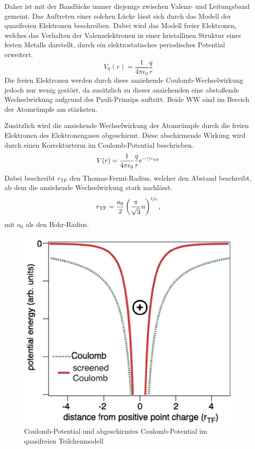 Daher ist mit der Bandlücke immer diejenige zwischen Valenz- und Leitungsband gemeint.
Das Auftreten einer solchen Lücke lässt sich durch das Modell der quasifreien Elektronen beschreiben. Dabei wird das Modell freier Elektronen, welches das Verhalten der Valenzelektronen in einer kristallinen Struktur eines festen Metalls darstellt, durch ein elektrostatisches periodisches Potential
erweitert.
\begin{equation}
    \label{eq:coulomb_potential}
    V_0(r) = \frac{1}{4\pi\epsilon_0}\frac{q}{r}
\end{equation}
Die freien Elektronen werden durch diese anziehende Coulomb-Wechselwirkung jedoch nur wenig gestört, da zusätzlich zu dieser anziehenden eine abstoßende Wechselwirkung aufgrund des Pauli-Prinzips auftritt. Beide WW sind im Bereich der Atomrümpfe am stärksten.

Zusätzlich wird die anziehende Wechselwirkung der Atomrümpfe durch die freien Elektronen des Elektronengases abgeschirmt. Diese abschirmende Wirkung wird durch einen Korrekturterm im Coulomb-Potential beschrieben.
\begin{equation}
    \label{eq:}
    V(r) = \frac{1}{4\pi\epsilon_0}\frac{q}{r}e^{-\nicefrac{r}{r_{\text{TF}}}}
\end{equation}
Dabei beschreibt $r_{\text{TF}}$ den Thomas-Fermi-Radius, welcher den Abstand beschreibt, ab dem die anziehende Wechselwirkung stark nachlässt.
\begin{equation}
    \label{eq:Thomas-Fermi-Radius}
    r_{\text{TF}} = \frac{a_0}{2}\left(\frac{\pi}{\sqrt{3}}n\right)^{\nicefrac{1}{6}},
\end{equation}
mit $a_0$ als den Bohr-Radius.

\begin{figure}[H]
    \centering
    \begin{samepage}
        \includegraphics[width=0.6\linewidth]{resources/05-01-2015/coulomb_potential_screened.png}
        \caption{Coulomb-Potential und abgeschirmtes Coulomb-Potential im quasifreien Teilchenmodell}
        \label{fig:coulomb_potential_with_and_without_screening}
    \end{samepage}
\end{figure}

